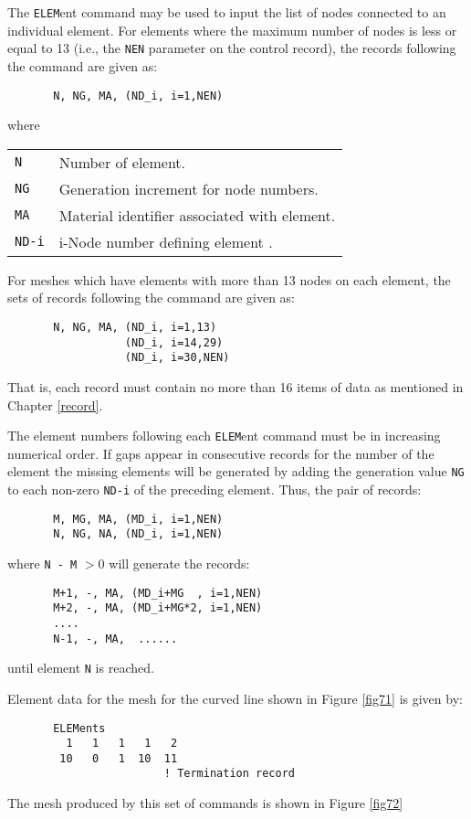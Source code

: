 The {\tt ELEM}ent command may be used to input the list of nodes connected
to an individual element.  For elements where the maximum number of
nodes is less or equal to 13 (i.e., the {\tt NEN} parameter on the
control record), the records following the command are
given as:
\begin{verbatim}
       N, NG, MA, (ND_i, i=1,NEN)
\end{verbatim}
where
\begin{center}
\begin{tabular}{ l l }
{\tt N }  & Number of element. \\
{\tt NG}  & Generation increment for node numbers. \\
{\tt MA}  & Material identifier associated with element. \\
{\tt ND-i} & i-Node number defining element . \\
\end{tabular}
\end{center}
For meshes which have elements with more than 13 nodes on each element,
the sets of records following the command are given as:
\begin{verbatim}
       N, NG, MA, (ND_i, i=1,13)
                  (ND_i, i=14,29)
                  (ND_i, i=30,NEN)
\end{verbatim}
That is, each record must contain no more than 16 items of data as mentioned
in Chapter \ref{record}.

The element numbers following each {\tt ELEM}ent command must be in increasing
numerical order.  If gaps appear in consecutive records
for the number of the element
the missing elements will be generated by adding the generation
value {\tt NG} to each non-zero {\tt ND-i} of the preceding element.  Thus,
the pair of records:
\begin{verbatim}
       M, MG, MA, (MD_i, i=1,NEN)
       N, NG, NA, (ND_i, i=1,NEN)
\end{verbatim}
where {\tt N - M} $> 0$ will generate the records:
\begin{verbatim}
       M+1, -, MA, (MD_i+MG  , i=1,NEN)
       M+2, -, MA, (MD_i+MG*2, i=1,NEN)
       ....
       N-1, -, MA,  ......
\end{verbatim}
until element {\tt N} is reached.

Element data for the mesh for the curved line shown in Figure \ref{fig71}
is given by:
\begin{verbatim}
       ELEMents
         1   1   1   1   2
        10   0   1  10  11
                        ! Termination record
\end{verbatim}
The mesh produced by this set of commands is shown in Figure \ref{fig72}

